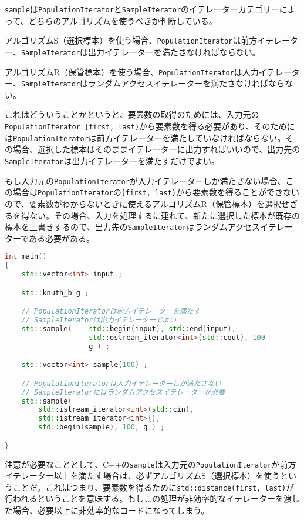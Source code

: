 \lstinline!sample!は\lstinline!PopulationIterator!と\lstinline!SampleIterator!のイテレーターカテゴリーによって、どちらのアルゴリズムを使うべきか判断している。

アルゴリズムS（選択標本）を使う場合、\lstinline!PopulationIterator!は前方イテレーター、\lstinline!SampleIterator!は出力イテレーターを満たさなければならない。

アルゴリズムR（保管標本）を使う場合、\lstinline!PopulationIterator!は入力イテレーター、\lstinline!SampleIterator!はランダムアクセスイテレーターを満たさなければならない。

これはどういうことかというと、要素数の取得のためには、入力元の\lstinline!PopulationIterator [first, last)!から要素数を得る必要があり、そのためには\lstinline!PopulationIterator!は前方イテレーターを満たしていなければならない。その場合、選択した標本はそのままイテレーターに出力すればいいので、出力先の\lstinline!SampleIterator!は出力イテレーターを満たすだけでよい。

もし入力元の\lstinline!PopulationIterator!が入力イテレーターしか満たさない場合、この場合は\lstinline!PopulationIterator!の\lstinline![first, last)!から要素数を得ることができないので、要素数がわからないときに使えるアルゴリズムR（保管標本）を選択せざるを得ない。その場合、入力を処理するに連れて、新たに選択した標本が既存の標本を上書きするので、出力先の\lstinline!SampleIterator!はランダムアクセスイテレーターである必要がある。

\begin{lstlisting}[language=C++]
int main()
{
    std::vector<int> input ;

    std::knuth_b g ;

    // PopulationIteratorは前方イテレーターを満たす
    // SampleIteratorは出力イテレーターでよい
    std::sample(    std::begin(input), std::end(input),
                    std::ostream_iterator<int>(std::cout), 100
                    g ) ;

    std::vector<int> sample(100) ;

    // PopulationIteratorは入力イテレーターしか満たさない
    // SampleIteratorにはランダムアクセスイテレーターが必要
    std::sample(
        std::istream_iterator<int>(std::cin),
        std::istream_iterator<int>{},
        std::begin(sample), 100, g ) ;

}
\end{lstlisting}

注意が必要なこととして、C++の\lstinline!sample!は入力元の\lstinline!PopulationIterator!が前方イテレーター以上を満たす場合は、必ずアルゴリズムS（選択標本）を使うということだ。これはつまり、要素数を得るために\lstinline!std::distance(first, last)!が行われるということを意味する。もしこの処理が非効率的なイテレーターを渡した場合、必要以上に非効率的なコードになってしまう。

